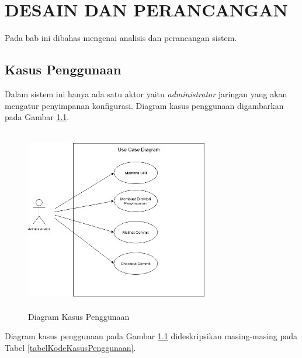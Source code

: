 \chapter{DESAIN DAN PERANCANGAN}
    Pada bab ini dibahas mengenai analisis dan perancangan sistem.
	
    \section{Kasus Penggunaan}
    	Dalam sistem ini hanya ada satu aktor yaitu \textit{administrator} jaringan yang akan mengatur penyimpanan konfigurasi. Diagram kasus penggunaan digambarkan pada Gambar \ref{usecase}.
        \begin{figure}[H]
			\centering
			\includegraphics[width=8cm,height=8cm]{Images/C-3/UC.png}
			\caption{Diagram Kasus Penggunaan}
			\label{usecase}
		\end{figure}
        \indent Diagram kasus penggunaan pada Gambar \ref{usecase} dideskripsikan masing-masing pada Tabel \ref {tabelKodeKasusPenggunaan}.
        
